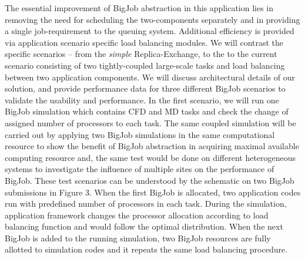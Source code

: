 \documentclass[a4paper]{article}
\begin{document}
The essential improvement of BigJob abstraction in this application lies in removing the need for scheduling the two-components separately and in providing a single job-requirement to the queuing system. Additional efficiency is provided via application scenario specific load balancing modules.  We will contrast the specific scenarios -- from the {\it simple} Replica-Exchange, to the %
to the current scenario consisting of two tightly-coupled large-scale tasks and load balancing between two application components. %
We will discuss architectural details of our solution, and provide performance data for three different BigJob scenarios to validate the usability and performance. In the first scenario, we will run one BigJob simulation which contains CFD and MD tasks and check the change of assigned number of processors to each task.  The same coupled simulation will be carried out by applying two BigJob simulations in the same computational resource to show the benefit of BigJob abstraction in acquiring maximal available computing resource and, the same test would be done on different heterogeneous systems to investigate the influence of multiple sites on the performance of BigJob. These test scenarios can be understood by the schematic on two BigJob submissions in Figure 3. When the first BigJob is allocated, two application codes run with predefined number of processors in each task. During the simulation, application framework changes the processor allocation according to load balancing function and would follow the optimal distribution. When the next BigJob is added to the running simulation, two BigJob resources are fully allotted to simulation codes and it repeats the same load balancing procedure.

\vspace{4pt}
\end{document}
